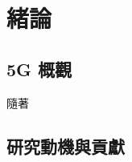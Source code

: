 \chapter{緒論}
\label{chapter:intro}


\section{5G 概觀}
\label{sec:5g_intro}

隨著

\section{研究動機與貢獻}
\label{sec:motivation_and_contribution}



